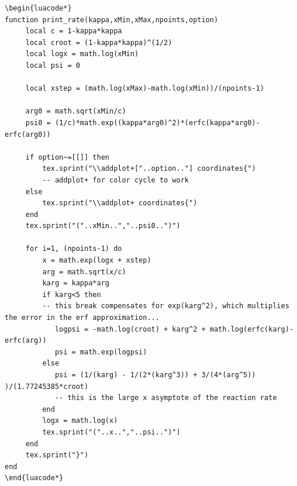 \begin{lstlisting}
\begin{luacode*}
function print_rate(kappa,xMin,xMax,npoints,option)
     local c = 1-kappa*kappa
     local croot = (1-kappa*kappa)^(1/2)
     local logx = math.log(xMin)
     local psi = 0
     
     local xstep = (math.log(xMax)-math.log(xMin))/(npoints-1)
     
     arg0 = math.sqrt(xMin/c)
     psi0 = (1/c)*math.exp((kappa*arg0)^2)*(erfc(kappa*arg0)-erfc(arg0))
     
     if option~=[[]] then
  		 tex.sprint("\\addplot+["..option.."] coordinates{") 
  		 -- addplot+ for color cycle to work
     else
  		 tex.sprint("\\addplot+ coordinates{")
     end
     tex.sprint("("..xMin..","..psi0..")")
     
     for i=1, (npoints-1) do
  		 x = math.exp(logx + xstep)
  		 arg = math.sqrt(x/c)
  		 karg = kappa*arg
  		 if karg<5 then 
		 -- this break compensates for exp(karg^2), which multiplies the error in the erf approximation...
  		    logpsi = -math.log(croot) + karg^2 + math.log(erfc(karg)-erfc(arg))
  		    psi = math.exp(logpsi)
  		 else
  		    psi = (1/(karg) - 1/(2*(karg^3)) + 3/(4*(arg^5)) )/(1.77245385*croot)
  		    -- this is the large x asymptote of the reaction rate
  		 end
  		 logx = math.log(x)
  		 tex.sprint("("..x..","..psi..")")
     end
     tex.sprint("}")
end
\end{luacode*}
\end{lstlisting}
